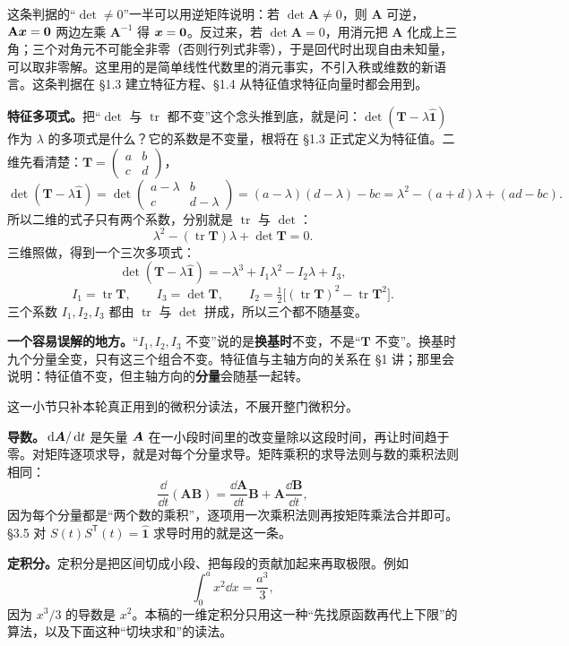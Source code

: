 \documentclass[11pt]{ctexart}
\newcommand{\ten}[1]{\mathbf{#1}}
\newcommand{\unitd}{\hat{\ten{1}}}
\newcommand{\tr}{\operatorname{tr}}
\let\origsubhdr\subhdr
\renewcommand{\subhdr}[1]{\par\needspace{3\baselineskip}\origsubhdr{#1}}
\begin{document}
这条判据的“$\det\ne0$”一半可以用逆矩阵说明：若 $\det\ten A\ne0$，则 $\ten A$ 可逆，$\ten A\vect x=\vect0$ 两边左乘 $\ten A^{-1}$ 得 $\boldsymbol{x}=\boldsymbol{0}$。反过来，若 $\det\ten A=0$，用消元把 $\ten A$ 化成上三角；三个对角元不可能全非零（否则行列式非零），于是回代时出现自由未知量，可以取非零解。这里用的是简单线性代数里的消元事实，不引入秩或维数的新语言。这条判据在 \S1.3 建立特征方程、\S1.4 从特征值求特征向量时都会用到。

\textbf{特征多项式。}把“$\det$ 与 $\tr$ 都不变”这个念头推到底，就是问：$\det(\ten T-\lambda\unitd)$ 作为 $\lambda$ 的多项式是什么？它的系数是不变量，根将在 \S1.3 正式定义为特征值。二维先看清楚：$\ten T=\begin{pmatrix}a&b\\c&d\end{pmatrix}$，
\[
\det(\ten T-\lambda\unitd)=\det\begin{pmatrix}a-\lambda&b\\c&d-\lambda\end{pmatrix}
=(a-\lambda)(d-\lambda)-bc=\lambda^2-(a+d)\lambda+(ad-bc).
\]
所以二维的式子只有两个系数，分别就是 $\tr$ 与 $\det$：
\[
\lambda^2-(\tr\ten T)\lambda+\det\ten T=0 .
\]
三维照做，得到一个三次多项式：
\[
\det(\ten T-\lambda\unitd)=-\lambda^3+I_1\lambda^2-I_2\lambda+I_3 ,
\]
\[
I_1=\tr\ten T,\qquad
I_3=\det\ten T,\qquad
I_2=\tfrac12\bigl[(\tr\ten T)^2-\tr\ten T^2\bigr].
\]
三个系数 $I_1,I_2,I_3$ 都由 $\tr$ 与 $\det$ 拼成，所以三个都不随基变。

\textbf{一个容易误解的地方。}“$I_1,I_2,I_3$ 不变”说的是\textbf{换基时}不变，不是“$\ten T$ 不变”。换基时九个分量全变，只有这三个组合不变。特征值与主轴方向的关系在 \S1 讲；那里会说明：特征值不变，但主轴方向的\textbf{分量}会随基一起转。

\label{subsec:calculus}

这一小节只补本轮真正用到的微积分读法，不展开整门微积分。

\textbf{导数。}$\,\mathrm{d}\boldsymbol{A}/\,\mathrm{d} t$ 是矢量 $\boldsymbol{A}$ 在一小段时间里的改变量除以这段时间，再让时间趋于零。对矩阵逐项求导，就是对每个分量求导。矩阵乘积的求导法则与数的乘积法则相同：
\[
\frac{\dd}{\dd t}(\ten A\ten B)=\frac{\dd\ten A}{\dd t}\ten B+\ten A\frac{\dd\ten B}{\dd t},
\]
因为每个分量都是“两个数的乘积”，逐项用一次乘积法则再按矩阵乘法合并即可。\S3.5 对 $S(t)S^{\mathsf T}(t)=\unitd$ 求导时用的就是这一条。

\textbf{定积分。}定积分是把区间切成小段、把每段的贡献加起来再取极限。例如
\[
\int_0^a x^2\dd x=\frac{a^3}{3},
\]
因为 $x^3/3$ 的导数是 $x^2$。本稿的一维定积分只用这一种“先找原函数再代上下限”的算法，以及下面这种“切块求和”的读法。
\end{document}
